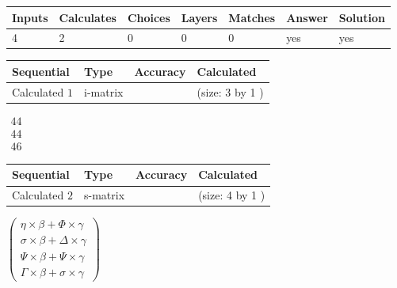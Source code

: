 \documentclass[12pt]{article}
\begin{document}
 

 
 
\noindent{}
 
 

 
\vspace{0.3in}
   
   
   
   
\noindent\begin{tabular}{|l|l|l|l|l|l|l|}
 \hline
Inputs & Calculates & Choices & Layers & Matches & Answer & Solution \\ \hline
           4  & 
           2  & 
           0
  & 
           0  & 
           0  & 
  yes & 
  yes 
  \\ \hline
 \end{tabular}
   
   
   
   
\noindent{}
   
   
  
  
\noindent\begin{tabular}{|l|l|l|l|}
\hline
 Sequential & Type & Accuracy & Calculated \\ 
\hline
 
 
  Calculated $            1 $ & i-matrix &  & 
 (size:            3  by            1 )
 \\  \hline  
 \end{tabular}
   
   
$\begin{array}{
 c
 }
          44  \\ 
          44  \\ 
          46
 \end{array}  $ 
  
  
\noindent\begin{tabular}{|l|l|l|l|}
\hline
 Sequential & Type & Accuracy & Calculated \\ 
\hline
 
 
  Calculated $            2 $ & s-matrix & & 
 (size:            4  by            1 )
 \\  \hline  
 \end{tabular}
   
   
 $  \left( \begin{array}
 {
 c
 }
  \eta \times  \beta +  \Phi \times  \gamma \\ 
  \sigma \times  \beta +  \Delta \times  \gamma \\ 
  \Psi \times  \beta +  \Psi \times  \gamma \\ 
  \Gamma \times  \beta +  \sigma \times  \gamma
 \end{array} \right) $ 
   
\end{document}
